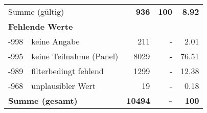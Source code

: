\begin{longtable}{lXrrr}
     \midrule
     \multicolumn{2}{l}{Summe (gültig)} &
       \textbf{\num{936}} &
     \textbf{100} &
       \textbf{\num[round-mode=places,round-precision=2]{8,92}} \\
     \multicolumn{5}{l}{\textbf{Fehlende Werte}}\\
       -998 &
       keine Angabe &
         \num{211} &
        - &
         \num[round-mode=places,round-precision=2]{2,01} \\
       -995 &
       keine Teilnahme (Panel) &
         \num{8029} &
        - &
         \num[round-mode=places,round-precision=2]{76,51} \\
       -989 &
       filterbedingt fehlend &
         \num{1299} &
        - &
         \num[round-mode=places,round-precision=2]{12,38} \\
       -968 &
       unplausibler Wert &
         \num{19} &
        - &
         \num[round-mode=places,round-precision=2]{0,18} \\
     \midrule
     \multicolumn{2}{l}{\textbf{Summe (gesamt)}} &
          \textbf{\num{10494}} &
        \textbf{-} &
        \textbf{100} \\
     \bottomrule
     \end{longtable}
     
